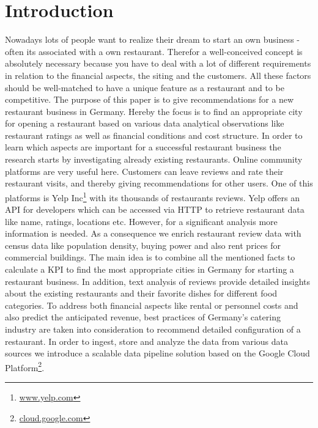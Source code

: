 \section{Introduction}
\label{sec:introduction}
Nowadays lots of people want to realize their dream to start an own business - often its associated with a own restaurant. Therefor a well-conceived concept is absolutely necessary because you have to deal with a lot of different requirements in relation to the financial aspects, the siting and the customers. All these factors should be well-matched to have a unique feature as a restaurant and to be competitive. \newline
The purpose of this paper is to give recommendations for a new restaurant business in Germany. Hereby the focus is to find an appropriate city for opening a restaurant based on various data analytical observations like restaurant ratings as well as financial conditions and cost structure.
In order to learn which aspects are important for a successful restaurant business the research starts by investigating already existing restaurants. Online community platforms are very useful here. Customers can leave reviews and rate their restaurant visits, and thereby giving recommendations for other users. One of this platforms is Yelp Inc\footnote{\href{https://www.yelp.com/}{www.yelp.com}} with its thousands of restaurants reviews. Yelp offers an \ac{API} for developers which can be accessed via HTTP to retrieve restaurant data like name, ratings, locations etc. However, for a significant analysis more information is needed. As a consequence we enrich restaurant review data with census data like population density, buying power and also rent prices for commercial buildings. The main idea is to combine all the mentioned facts to calculate a \ac{KPI} to find the most appropriate cities in Germany for starting a restaurant business. In addition, text analysis of reviews provide detailed insights about the existing restaurants and their favorite dishes for different food categories. To address both financial aspects like rental or personnel costs and also predict the anticipated revenue, best practices of Germany's catering industry are taken into consideration to recommend detailed configuration of a restaurant. In order to ingest, store and analyze the data from various data sources we introduce a scalable data pipeline solution based on the Google Cloud Platform\footnote{\href{https://cloud.google.com/}{cloud.google.com}}.

